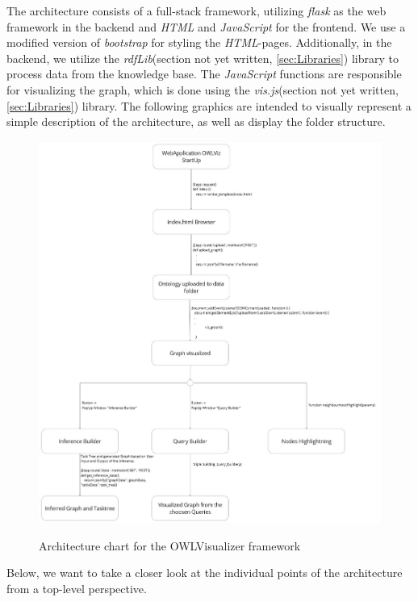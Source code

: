 The architecture consists of a full-stack framework, utilizing \textit{flask} as the web framework in the backend and \textit{HTML} and \textit{JavaScript} for the frontend. 
We use a modified version of \textit{bootstrap} for styling the \textit{HTML}-pages. Additionally, in the backend, we utilize the \textit{rdfLib}(section not yet written, 
\ref{sec:Libraries}) library to process data from the knowledge base. The \textit{JavaScript} functions are responsible for visualizing the graph, which is done using the \textit{vis.js}(section not yet written, 
\ref{sec:Libraries}) library. The following graphics are intended to visually represent a simple description of the architecture, as well as display the folder structure.
\begin{figure}[H]
    \includegraphics[scale=0.35]{Graphics/OWLViz_architecture.jpg}
    \label{fig:OWLViz_architecture}
    \caption{Architecture chart for the OWLVisualizer framework}
\end{figure}

Below, we want to take a closer look at the individual points of the architecture from a top-level perspective.

